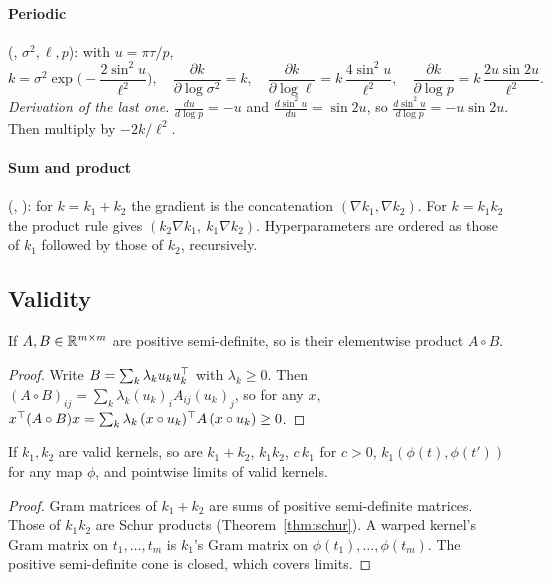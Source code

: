 \documentclass[11pt,a4paper]{article}
\begin{document}
\paragraph{Periodic} (, $\sigma^2,\ell,p$): with $u=\pi\tau/p$,
\[
  k=\sigma^2\exp\!\Big(-\frac{2\sin^2u}{\ell^2}\Big),\quad
  \frac{\partial k}{\partial\log\sigma^2}=k,\quad
  \frac{\partial k}{\partial\log\ell}=k\,\frac{4\sin^2u}{\ell^2},\quad
  \frac{\partial k}{\partial\log p}=k\,\frac{2u\sin 2u}{\ell^2}.
\]
\emph{Derivation of the last one.} $\frac{du}{d\log p}=-u$ and
$\frac{d\sin^2u}{du}=\sin2u$, so $\frac{d\sin^2u}{d\log p}=-u\sin2u$. Then
multiply by $-2k/\ell^2$.

\paragraph{Sum and product} (, ): for
$k=k_1+k_2$ the gradient is the concatenation $(\nabla k_1,\nabla k_2)$. For
$k=k_1k_2$ the product rule gives $(k_2\nabla k_1,\ k_1\nabla k_2)$.
Hyperparameters are ordered as those of $k_1$ followed by those of $k_2$, recursively.

\subsection{Validity}

\begin{theorem}\label{thm:schur}
If $A,B\in\mathbb{R}^{m\times m}$ are positive semi-definite, so is their elementwise
product $A\circ B$.
\end{theorem}
\begin{proof}
Write $B=\sum_k\lambda_ku_ku_k^\top$ with $\lambda_k\ge0$. Then $(A\circ B)_{ij}=\sum_k\lambda_k(u_k)_iA_{ij}(u_k)_j$,
so for any $x$,
$x^\top(A\circ B)x=\sum_k\lambda_k\,(x\circ u_k)^\top A\,(x\circ u_k)\ge0$.
\end{proof}

\begin{corollary}\label{cor:closure}
If $k_1,k_2$ are valid kernels, so are $k_1+k_2$, $k_1k_2$, $c\,k_1$ for $c>0$,
$k_1(\phi(t),\phi(t'))$ for any map $\phi$, and pointwise limits of valid kernels.
\end{corollary}
\begin{proof}
Gram matrices of $k_1+k_2$ are sums of positive semi-definite matrices. Those of $k_1k_2$ are Schur
products (Theorem~\ref{thm:schur}). A warped kernel's Gram matrix on $t_1,\dots,t_m$ is $k_1$'s
Gram matrix on $\phi(t_1),\dots,\phi(t_m)$. The positive semi-definite cone is closed, which covers limits.
\end{proof}
\end{document}
